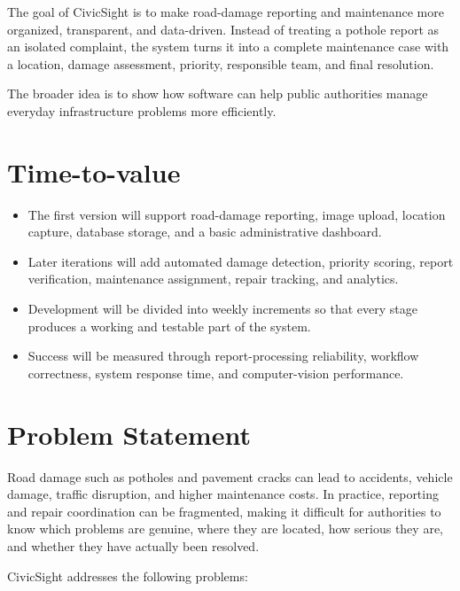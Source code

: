 \documentclass[11pt,a4paper]{article}
\begin{document}
The goal of CivicSight is to make road-damage reporting and maintenance more organized, transparent, and data-driven. Instead of treating a pothole report as an isolated complaint, the system turns it into a complete maintenance case with a location, damage assessment, priority, responsible team, and final resolution.

The broader idea is to show how software can help public authorities manage everyday infrastructure problems more efficiently.


\section{Time-to-value}

\begin{itemize}[leftmargin=0.6cm]

    \item The first version will support road-damage reporting, image upload, location capture, database storage, and a basic administrative dashboard.

    \item Later iterations will add automated damage detection, priority scoring, report verification, maintenance assignment, repair tracking, and analytics.

    \item Development will be divided into weekly increments so that every stage produces a working and testable part of the system.

    \item Success will be measured through report-processing reliability, workflow correctness, system response time, and computer-vision performance.

\end{itemize}


\section{Problem Statement}

Road damage such as potholes and pavement cracks can lead to accidents, vehicle damage, traffic disruption, and higher maintenance costs. In practice, reporting and repair coordination can be fragmented, making it difficult for authorities to know which problems are genuine, where they are located, how serious they are, and whether they have actually been resolved.

CivicSight addresses the following problems:
\end{document}
